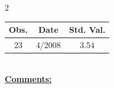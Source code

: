 
\bigskip 
\begin{multicols}{2}{ 
\begin{tabular}{ccc}
\hline  Obs.  &  Date &  Std. Val. \\ 
\hline 
                       23 &        4/2008 &          3.54 \vspace{-.12in} \\  
 \end{tabular} 
\\ 
 \columnbreak 
 \singlespacing 
 \underline{\textbf{Comments:}} \\ 
 \bigskip       

 } 
\end{multicols} 
